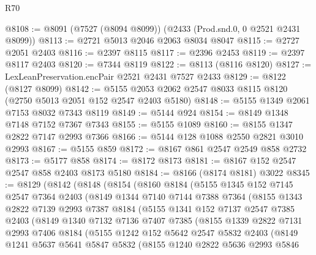 \begin{lexlean}{R70}
\begin{coremodule}
@8108 := @8091 (@7527 (@8094 @8099)) (@2433 (Prod.snd.{0, 0} @2521 @2431 @8099))
@8113 := @2721 @5013 @2046 @2063 @8034 @8047
@8115 := @2727 @2051 @2403
@8116 := @2397 @8115
@8117 := @2396 @2453
@8119 := @2397 @8117 @2403
@8120 := @7344 @8119
@8122 := @8113 (@8116 @8120)
@8127 := LexLeanPreservation.encPair @2521 @2431 @7527 @2433
@8129 := @8122 (@8127 @8099)
@8142 := @5155 @2053 @2062 @2547 @8033 @8115 @8120 (@2750 @5013 @2051 @152 @2547 @2403 @5180)
@8148 := @5155 @1349 @2061 @7153 @8032 @7343 @8119
@8149 := @5144 @924
@8154 := @8149 @1348 @7148 @7152 @7367 @7343
@8155 := @5155 @1089
@8160 := @8155 @1347 @2822 @7147 @2993 @7366
@8166 := @5144 @128 @1088 @2550 @2821 @3010 @2993
@8167 := @5155 @859
@8172 := @8167 @861 @2547 @2549 @858 @2732
@8173 := @5177 @858
@8174 := @8172 @8173
@8181 := @8167 @152 @2547 @2547 @858 @2403 @8173 @5180
@8184 := @8166 (@8174 @8181) @3022
@8345 := @8129
    (@8142
      (@8148
        (@8154
          (@8160
            @8184
            (@5155
              @1345
              @152
              @7145
              @2547
              @7364
              @2403
              (@8149
                @1344
                @7140
                @7144
                @7388
                @7364
                (@8155
                  @1343
                  @2822
                  @7139
                  @2993
                  @7387
                  @8184
                  (@5155
                    @1341
                    @152
                    @7137
                    @2547
                    @7385
                    @2403
                    (@8149
                      @1340
                      @7132
                      @7136
                      @7407
                      @7385
                      (@8155
                        @1339
                        @2822
                        @7131
                        @2993
                        @7406
                        @8184
                        (@5155
                          @1242
                          @152
                          @5642
                          @2547
                          @5832
                          @2403
                          (@8149
                            @1241
                            @5637
                            @5641
                            @5847
                            @5832
                            (@8155
                              @1240
                              @2822
                              @5636
                              @2993
                              @5846

\end{coremodule}
\end{lexlean}
